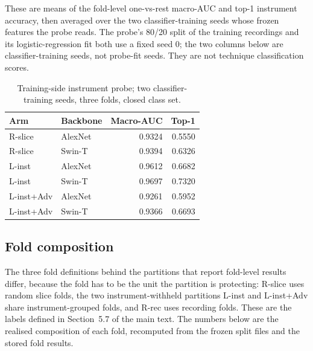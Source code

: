 These are means of the fold-level one-vs-rest macro-AUC and top-1 instrument accuracy, then averaged over the two classifier-training seeds whose frozen features the probe reads. The
probe's 80/20 split of the training recordings and its logistic-regression fit both use a fixed
seed 0; the two columns below are classifier-training seeds, not probe-fit seeds. They are not technique classification scores.

\begin{table}[ht]\centering\small\caption{Training-side instrument probe; two classifier-training seeds, three folds, closed class set.}

\begin{tabular}{llrr}\toprule Arm & Backbone & Macro-AUC & Top-1 \\\midrule

R-slice & AlexNet & 0.9324 & 0.5550 \\

R-slice & Swin-T & 0.9394 & 0.6326 \\

L-inst & AlexNet & 0.9612 & 0.6682 \\

L-inst & Swin-T & 0.9697 & 0.7320 \\

L-inst+Adv & AlexNet & 0.9261 & 0.5952 \\

L-inst+Adv & Swin-T & 0.9366 & 0.6693 \\

\bottomrule\end{tabular}\end{table}

\subsection{Fold composition}
\label{sec:fold-composition}

The three fold definitions behind the partitions that report fold-level results differ, because the
fold has to be the unit the partition is protecting: R-slice uses random slice folds, the two
instrument-withheld partitions L-inst and L-inst+Adv share instrument-grouped folds, and R-rec
uses recording folds. These are the labels defined in Section~5.7 of the main text. The numbers
below are the realised composition of each fold, recomputed from the frozen split files and the
stored fold results.

